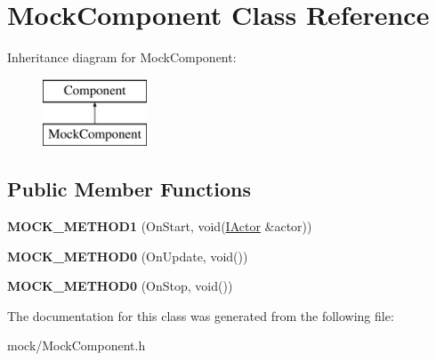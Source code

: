 \hypertarget{classMockComponent}{}\section{Mock\+Component Class Reference}
\label{classMockComponent}
Inheritance diagram for Mock\+Component\+:\begin{figure}[H]
\begin{center}
\leavevmode
\includegraphics[height=2.000000cm]{classMockComponent}
\end{center}
\end{figure}
\subsection*{Public Member Functions}
\begin{DoxyCompactItemize}
\item 
{\bfseries M\+O\+C\+K\+\_\+\+M\+E\+T\+H\+O\+D1} (On\+Start, void(\hyperlink{classIActor}{I\+Actor} \&actor))\hypertarget{classMockComponent_abead104cba2aece56b8850d172b50b0d}{}\label{classMockComponent_abead104cba2aece56b8850d172b50b0d}

\item 
{\bfseries M\+O\+C\+K\+\_\+\+M\+E\+T\+H\+O\+D0} (On\+Update, void())\hypertarget{classMockComponent_a911a85ce132a6749818484bd88fc6c81}{}\label{classMockComponent_a911a85ce132a6749818484bd88fc6c81}

\item 
{\bfseries M\+O\+C\+K\+\_\+\+M\+E\+T\+H\+O\+D0} (On\+Stop, void())\hypertarget{classMockComponent_a2673dd9ef654ae81a36544a38388dc63}{}\label{classMockComponent_a2673dd9ef654ae81a36544a38388dc63}

\end{DoxyCompactItemize}


The documentation for this class was generated from the following file\+:\begin{DoxyCompactItemize}
\item 
mock/Mock\+Component.\+h\end{DoxyCompactItemize}
